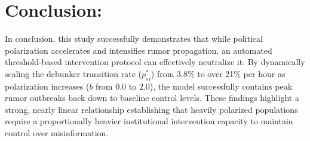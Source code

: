 \documentclass[11pt]{article}
\begin{document}
 \section{Conclusion:}

In conclusion, this study successfully demonstrates that while political polarization accelerates and intensifies rumor propagation, an automated threshold-based intervention protocol can effectively neutralize it. By dynamically scaling the debunker transition rate ($p_{si}^*$) from 3.8\% to over 21\% per hour as polarization increases ($b$ from $0.0$ to $2.0$), the model successfully contains peak rumor outbreaks back down to baseline control levels. These findings highlight a strong, nearly linear relationship establishing that heavily polarized populations require a proportionally heavier institutional intervention capacity to maintain control over misinformation.
\end{document}

